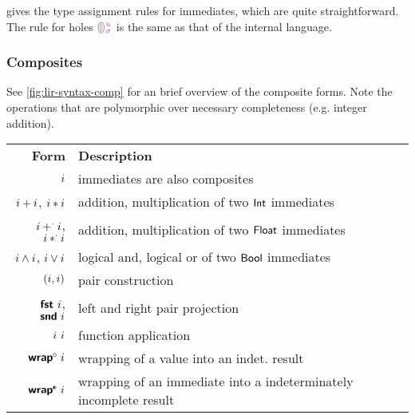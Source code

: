 \documentclass[index.tex]{subfiles}
\begin{document}
 gives the type assignment rules for immediates, which are quite
straightforward. The rule for holes $\EEHole{\SortHoleIdVar}{\SortHoleEnvVar}$ is the same as
that of the internal \Hazel{} language.

\subsubsection{Composites}
\label{sec:lir-composites}
See \cref{fig:lir-syntax-comp} for an brief overview of the composite forms. Note the operations that
are polymorphic over necessary completeness (e.g. integer addition).

\begin{table}
  \begin{center}
    \begin{tabular}{rl}
      \textbf{Form} & \textbf{Description} \\

      $i$ 
        & immediates are also composites \\
      
      $i + i$, $i * i$
        & addition, multiplication of two $\textsf{Int}$ immediates \\

      $i +^{\cdot} i$, $i *^{\cdot} i$
        & addition, multiplication of two $\textsf{Float}$ immediates \\

      $i \land i$, $i \lor i$
        & logical and, logical or of two $\textsf{Bool}$ immediates \\

      $(i, i)$
        & pair construction \\

      $\textsf{\textbf{fst}}~ i$, $\textsf{\textbf{snd}}~ i$
        & left and right pair projection \\

      $i ~i$
        & function application \\

      $\EWrapIntoNI{\SortImmVar}$
        & wrapping of a value into an indet. result \\

      $\EWrapIntoII{\SortImmVar}$
        & wrapping of an immediate into a indeterminately incomplete
        result \\


\end{tabular}
\end{center}
\end{table}
\end{document}
